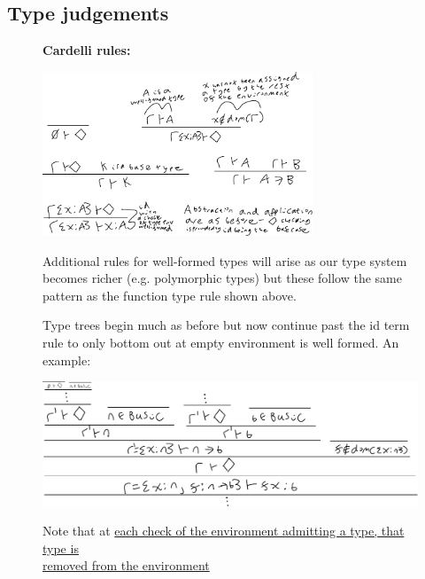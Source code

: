 \documentclass[20pt,a4paper,landscape]{extarticle}
\begin{document}
\begin{flushleft}
\subsection{Type judgements}
\FloatBarrier
\begin{figure}[h]
\textbf{Cardelli rules:}
\begin{center}
\includegraphics[width=0.72\textwidth]{meta/cs349/Cardelli.pdf}{}
\end{center}
Additional rules for well-formed types will arise as our type system becomes richer (e.g. polymorphic types) but these follow the same pattern as the function type rule shown above.
\end{figure}
\FloatBarrier
\FloatBarrier
\begin{figure}[h]
Type trees begin much as before but now continue past the id term rule to only bottom out at empty environment is well formed. An example:
\begin{center}
\includegraphics[width=\textwidth]{meta/cs349/Cardelli_Example.pdf}{}
\end{center}
Note that at \underline{each check of the environment admitting a type, that type is}\\
\underline{removed from the environment}
\end{figure}
\FloatBarrier
\clearpage

\end{flushleft}
\end{document}
